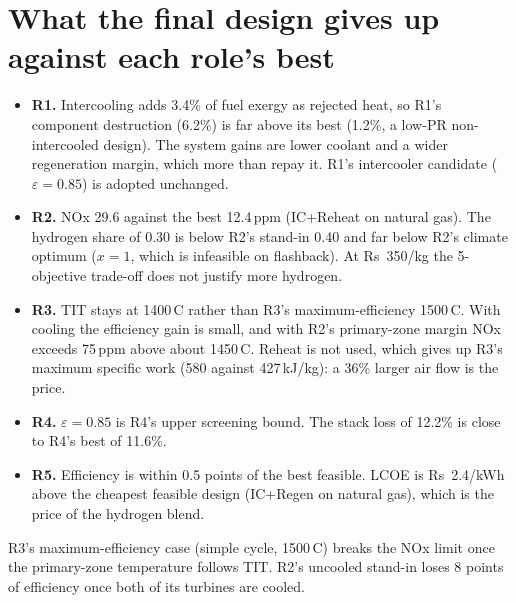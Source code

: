 \documentclass[10.5pt,a4paper]{article}
\newcommand{\Rs}{Rs~}
\begin{document}
\section{What the final design gives up against each role's best}\label{sec:roles}
\begin{table}[H]\centering\scriptsize\caption{Each role's individually-best value within the feasible set, against the final design.}\label{tab:roles}
\end{table}
\begin{itemize}[leftmargin=1.2em,itemsep=1pt]
\item \textbf{R1.} Intercooling adds 3.4\% of fuel exergy as rejected heat, so R1's component destruction (6.2\%) is far above its best (1.2\%, a low-PR non-intercooled design). The system gains are lower coolant and a wider regeneration margin, which more than repay it. R1's intercooler candidate ($\varepsilon=0.85$) is adopted unchanged.
\item \textbf{R2.} NOx 29.6 against the best 12.4\,ppm (IC+Reheat on natural gas). The hydrogen share of 0.30 is below R2's stand-in 0.40 and far below R2's climate optimum ($x=1$, which is infeasible on flashback). At \Rs350/kg the 5-objective trade-off does not justify more hydrogen.
\item \textbf{R3.} TIT stays at 1400\,\textdegree C rather than R3's maximum-efficiency 1500\,\textdegree C. With cooling the efficiency gain is small, and with R2's primary-zone margin NOx exceeds 75\,ppm above about 1450\,\textdegree C. Reheat is not used, which gives up R3's maximum specific work (580 against 427\,kJ/kg): a 36\% larger air flow is the price.
\item \textbf{R4.} $\varepsilon=0.85$ is R4's upper screening bound. The stack loss of 12.2\% is close to R4's best of 11.6\%.
\item \textbf{R5.} Efficiency is within 0.5 points of the best feasible. LCOE is \Rs2.4/kWh above the cheapest feasible design (IC+Regen on natural gas), which is the price of the hydrogen blend.
\end{itemize}
\begin{table}[H]\centering\scriptsize\caption{Each teammate's submitted candidate re-run through the cooled integrated model.}\label{tab:rolecands}
\end{table}
R3's maximum-efficiency case (simple cycle, 1500\,\textdegree C) breaks the NOx limit once the primary-zone temperature follows TIT. R2's uncooled stand-in loses 8 points of efficiency once both of its turbines are cooled.
\end{document}
